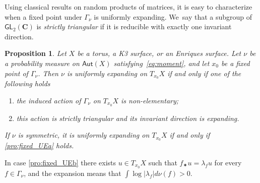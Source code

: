 \documentclass[11pt]{article}
\newenvironment{enumeratea}
{\bgroup\def\theenumi{\alph{enumi}}\begin{enumerate}}
{\end{enumerate}\egroup}
\newcommand{\abs}[1]{\left\vert#1\right\vert}
\def\C{\mathbf{C}}
\newcommand\Aut{\mathsf{Aut}}
\newcommand\GL{{\mathsf{GL}}}
\theoremstyle{plain}
\newtheorem{pro}[thm]{Proposition}
\theoremstyle{definition}
\numberwithin{equation}{section}
\begin{document}
Using classical results on random products of matrices, it is easy
to characterize when a fixed point under $\Gamma_\nu$ is uniformly expanding. We~say that a subgroup of $\GL_2(\C)$ is
\emph{strictly triangular} if it is reducible with exactly one invariant direction.

\begin{pro}\label{pro:fixed_UE}
Let $X$ be a torus, a K3 surface, or an Enriques surface. Let
$\nu$ be a probability measure on $\Aut(X)$ satisfying~\eqref{eq:moment}, and let $x_0$ be a fixed point of
$\Gamma_\nu$. Then $\nu$ is uniformly expanding on $T_{x_0}X$ if and only if one of the following holds
\begin{enumeratea}
\item\label{pro:fixed_UEa} the
induced action of $\Gamma_\nu$ on $ T_{x_0}X$ is non-elementary;
\item\label{pro:fixed_UEb} this action is strictly triangular and its invariant direction
is expanding.
\end{enumeratea}
If $\nu$ is symmetric, it is uniformly expanding on $T_{x_0}X$ if and only if \eqref{pro:fixed_UEa} holds.
\end{pro}

In case \eqref{pro:fixed_UEb} there exists $ u\in T_{x_0}X$ such that $f_\varstar u = \lambda_f u$ for every $f\in \Gamma_\nu$, and the expansion means that $\int \log \abs{\lambda_f} d\nu(f) >0$.
\end{document}
